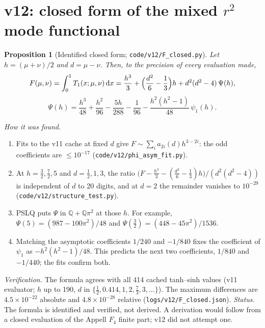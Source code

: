 \documentclass[11pt,a4paper]{article}
\newcommand{\loc}[1]{\nolinkurl{#1}}
\theoremstyle{plain}
\newtheorem{proposition}[theorem]{Proposition}
\theoremstyle{definition}
\theoremstyle{remark}
\numberwithin{equation}{section}
\begin{document}
\section{v12: closed form of the mixed \texorpdfstring{\(r^2\)}{r2} mode functional}
\label{sec:v12F}

\begin{proposition}[Identified closed form; \loc{code/v12/F_closed.py}]
\label{prop:v12F}
Let \(h=(\mu+\nu)/2\) and \(d=\mu-\nu\). Then, to the precision of
every evaluation made,
\[
F(\mu,\nu)=\int_0^1T_1(x;\mu,\nu)\,\mathrm dx
=\frac{h^3}{3}+\Bigl(\frac{d^2}{6}-\frac13\Bigr)h+d^2(d^2-4)\,\Psi(h),
\]
\[
\Psi(h)=\frac{h^3}{48}+\frac{h^2}{96}-\frac{5h}{288}-\frac1{96}-\frac{h^2(h^2-1)}{48}\,\psi_1(h).
\]
\end{proposition}
\noindent\emph{How it was found.}
\begin{enumerate}[label=(\alph*)]
\item Fits to the v11 cache at fixed \(d\) give
\(F\sim\sum_ia_{2i}(d)h^{3-2i}\): the odd coefficients are
\(\le10^{-17}\) (\loc{code/v12/phi_asym_fit.py}).
\item At \(h=\tfrac32,\tfrac72,5\) and \(d=\tfrac12,1,3\), the ratio
\(\bigl(F-\tfrac{h^3}3-(\tfrac{d^2}6-\tfrac13)h\bigr)/(d^2(d^2-4))\)
is independent of \(d\) to 20 digits, and at \(d=2\) the remainder
vanishes to \(10^{-29}\) (\loc{code/v12/structure_test.py}).
\item PSLQ puts \(\Psi\) in \(\mathbb Q+\mathbb Q\pi^2\) at those
\(h\). For example, \(\Psi(5)=(987-100\pi^2)/48\) and
\(\Psi(\tfrac32)=(448-45\pi^2)/1536\).
\item Matching the asymptotic coefficients \(1/240\) and \(-1/840\)
fixes the coefficient of \(\psi_1\) as \(-h^2(h^2-1)/48\). This
predicts the next two coefficients, \(1/840\) and \(-1/440\); the
fits confirm both.
\end{enumerate}
\emph{Verification.} The formula agrees with all 414 cached
tanh--sinh values (v11 evaluator; \(h\) up to 190, \(d\) in
\(\{\tfrac12,0.414,1,2,\tfrac73,3,\dots\}\)). The maximum differences
are \(4.5\times10^{-22}\) absolute and \(4.8\times10^{-28}\) relative
(\loc{logs/v12/F_closed.json}). \emph{Status.} The formula is
identified and verified, not derived. A derivation would follow from
a closed evaluation of the Appell \(F_4\) finite part; v12 did not
attempt one.
\end{document}
